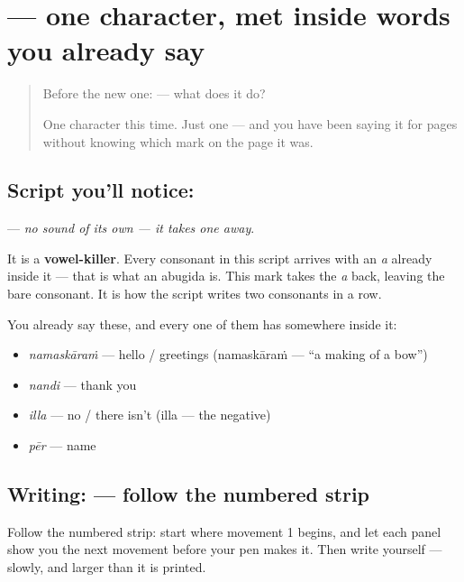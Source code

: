 \section[\texorpdfstring{\ml{്} (virama)}{് (virama)}]{ — one character, met inside words you already say}

\label{lesson:ML-S02-sign-virama}



\begin{quote}
Before the new one:  — what does it do?

One character this time. Just one — and you have been saying it for pages without knowing which mark on the page it was.
\end{quote}

\subsection*{Script you'll notice: }
\textbf{} — \emph{no sound of its own — it takes one away}.

It is a \textbf{vowel-killer}. Every consonant in this script arrives with an \emph{a} already inside it — that is what an abugida is. This mark takes the \emph{a} back, leaving the bare consonant. It is how the script writes two consonants in a row.

You already say these, and every one of them has  somewhere inside it:

\begin{itemize}
\raggedright
  \item \textbf{} \emph{namaskāraṁ} — hello / greetings (namaskāraṁ — \textquotedblleft{}a making of a bow\textquotedblright{})
  \item \textbf{} \emph{nandi} — thank you
  \item \textbf{} \emph{illa} — no / there isn't (illa — the negative)
  \item \textbf{} \emph{pēr} — name
\end{itemize}

\subsection*{Writing:  — follow the numbered strip}

Follow the numbered strip: start where movement 1 begins, and let each panel show you the next movement before your pen makes it. Then write  yourself — slowly, and larger than it is printed.

